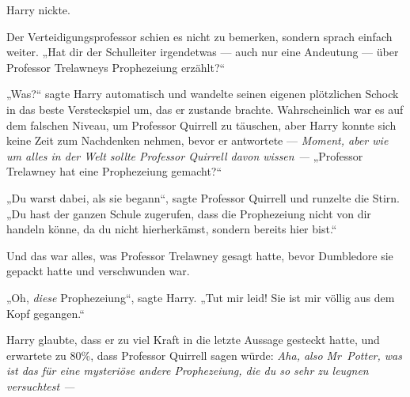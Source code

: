 Harry nickte.

Der Verteidigungsprofessor schien es nicht zu bemerken, sondern sprach einfach weiter.
„Hat dir der Schulleiter irgendetwas — auch nur eine Andeutung — über Professor Trelawneys Prophezeiung erzählt?“

„Was?“ sagte Harry automatisch und wandelte seinen eigenen plötzlichen Schock in das beste Versteckspiel um, das er zustande brachte.
Wahrscheinlich war es auf dem falschen Niveau, um Professor Quirrell zu täuschen, aber Harry konnte sich keine Zeit zum Nachdenken nehmen, bevor er antwortete — \emph{Moment, aber wie um alles in der Welt sollte Professor Quirrell davon wissen —}
„Professor Trelawney hat eine Prophezeiung gemacht?“

„Du warst dabei, als sie begann“, sagte Professor Quirrell und runzelte die Stirn.
„Du hast der ganzen Schule zugerufen, dass die Prophezeiung nicht von dir handeln könne, da du nicht hierherkämst, sondern bereits hier bist.“


Und das war alles, was Professor Trelawney gesagt hatte, bevor Dumbledore sie gepackt hatte und verschwunden war.

„Oh, \emph{diese} Prophezeiung“, sagte Harry.
„Tut mir leid! Sie ist mir völlig aus dem Kopf gegangen.“

Harry glaubte, dass er zu viel Kraft in die letzte Aussage gesteckt hatte, und erwartete zu 80\%, dass Professor Quirrell sagen würde: \emph{Aha, also Mr~Potter, was ist das für eine mysteriöse \emph{andere} Prophezeiung, die du so sehr zu leugnen versuchtest —}

